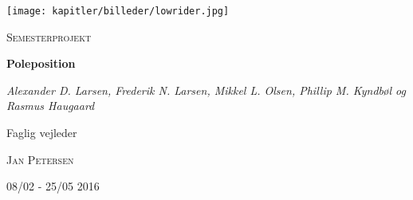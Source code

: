 
\begin{titlepage}
	\centering
	\texttt{[image: kapitler/billeder/lowrider.jpg]}
	\vspace{1cm}
	{\scshape\Large Semesterprojekt\par}
	\vspace{1.5cm}
	{\huge\bfseries Poleposition\par}
	\vspace{2cm}
	{\Large\itshape Alexander D. Larsen, Frederik N. Larsen, Mikkel L. Olsen, Phillip M. Kyndbøl og Rasmus Haugaard\par}
	\vfill
	Faglig vejleder\par
	\textsc{Jan Petersen}

	\vfill

	{\large 08/02 - 25/05 2016}
\end{titlepage}
